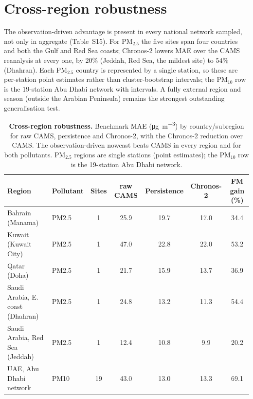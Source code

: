 \documentclass[11pt]{article}
\newcommand*{\pmtf}{\ensuremath{\mathrm{PM_{2.5}}}}
\newcommand*{\pmten}{\ensuremath{\mathrm{PM_{10}}}}
\begin{document}
\section{Cross-region robustness}
The observation-driven advantage is present in every national network sampled, not only in aggregate (Table~S15). For \pmtf{} the five sites span four countries and both the Gulf and Red Sea coasts; Chronos-2 lowers MAE over the CAMS reanalysis at every one, by $20\%$ (Jeddah, Red Sea, the mildest site) to $54\%$ (Dhahran). Each \pmtf{} country is represented by a single station, so these are per-station point estimates rather than cluster-bootstrap intervals; the \pmten{} row is the 19-station Abu Dhabi network with intervals. A fully external region and season (outside the Arabian Peninsula) remains the strongest outstanding generalisation test.

\begin{table}[htbp]\centering\footnotesize
\caption{\textbf{Cross-region robustness.} Benchmark MAE (\si{\micro\gram\per\cubic\metre}) by country/subregion for raw CAMS, persistence and Chronos-2, with the Chronos-2 reduction over CAMS. The observation-driven nowcast beats CAMS in every region and for both pollutants. \pmtf{} regions are single stations (point estimates); the \pmten{} row is the 19-station Abu Dhabi network.}
\begin{tabular}{llccccc}\toprule
Region & Pollutant & Sites & raw CAMS & Persistence & Chronos-2 & FM gain (\%) \\ \midrule
Bahrain (Manama) & PM2.5 & 1 & 25.9 & 19.7 & 17.0 & 34.4 \\
Kuwait (Kuwait City) & PM2.5 & 1 & 47.0 & 22.8 & 22.0 & 53.2 \\
Qatar (Doha) & PM2.5 & 1 & 21.7 & 15.9 & 13.7 & 36.9 \\
Saudi Arabia, E. coast (Dhahran) & PM2.5 & 1 & 24.8 & 13.2 & 11.3 & 54.4 \\
Saudi Arabia, Red Sea (Jeddah) & PM2.5 & 1 & 12.4 & 10.8 & 9.9 & 20.2 \\
UAE, Abu Dhabi network & PM10 & 19 & 43.0 & 13.0 & 13.3 & 69.1 \\
\bottomrule\end{tabular}\end{table}
\end{document}
